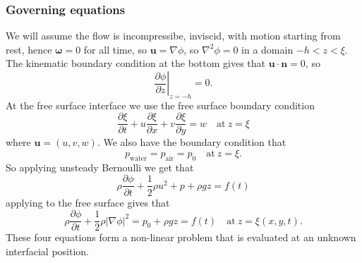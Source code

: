 \documentclass{article}
\begin{document}
\subsubsection{Governing equations}
We will assume the flow is incompressibe, inviscid, with motion starting from rest, hence $ \boldsymbol\omega = 0 $ for all time, so $ \mathbf u = \nabla \phi $, so $ \nabla^2 \phi = 0 $ in a domain $ -h<z<\xi $. The kinematic boundary condition at the bottom gives that $ \mathbf u \cdot\mathbf n = 0  $, so
\[
	\left.\frac{\partial \phi}{\partial z}\right|_{z=-h} = 0.
\]
At the free surface interface we use the free surface boundary condition
\[
	\frac{\partial \xi}{\partial t} + u\frac{\partial \xi}{\partial x}+v\frac{\partial \xi}{\partial y} = w\quad \text{at}\ z=\xi
\]
where $ \mathbf u = (u,v,w) $. We also have the boundary condition that
\[
	p_{\text{water}}=p_{\text{air}} = p_0 \quad \text{at}\ z=\xi.
\]
So applying unsteady Bernoulli we get that
\[
	\rho \frac{\partial \phi}{\partial t}+\frac 12 \rho u^2 + p + \rho g z= f(t)
\]
applying to the free surface gives that
\[
	\rho \frac{\partial\phi}{\partial t}+\frac 12 \rho |\nabla\phi|^2 = p_0 +\rho g z=f(t)\quad \text{at}\ z=\xi(x,y,t).
\]
These four equations form a non-linear problem that is evaluated at an unknown interfacial position.
\end{document}
